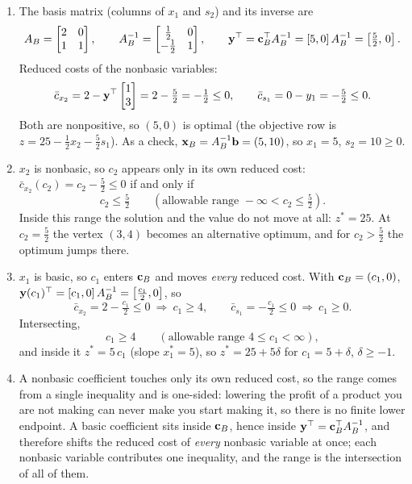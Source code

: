 \begin{enumerate}
\item The basis matrix (columns of $x_1$ and $s_2$) and its inverse are
\[
A_B = \begin{bmatrix} 2 & 0 \\ 1 & 1 \end{bmatrix}, \qquad
A_B^{-1} = \begin{bmatrix} \tfrac12 & 0 \\ -\tfrac12 & 1 \end{bmatrix},
\qquad
\mathbf{y}^\top = \mathbf{c}_B^\top A_B^{-1} = [5, 0]\,A_B^{-1} = \left[\tfrac52,\, 0\right].
\]
Reduced costs of the nonbasic variables:
\[
\bar{c}_{x_2} = 2 - \mathbf{y}^\top \begin{bmatrix} 1 \\ 3 \end{bmatrix} = 2 - \tfrac52 = -\tfrac12 \le 0,
\qquad
\bar{c}_{s_1} = 0 - y_1 = -\tfrac52 \le 0 .
\]
Both are nonpositive, so $(5,0)$ is optimal (the objective row is $z = 25 - \tfrac12 x_2 - \tfrac52 s_1$). As a check, $\mathbf{x}_B = A_B^{-1}\mathbf{b} = (5, 10)$, so $x_1 = 5$, $s_2 = 10 \ge 0$.
\item $x_2$ is nonbasic, so $c_2$ appears only in its own reduced cost: $\bar{c}_{x_2}(c_2) = c_2 - \tfrac52 \le 0$ if and only if
\[
\boxed{c_2 \le \tfrac52} \qquad (\text{allowable range } -\infty < c_2 \le \tfrac52).
\]
Inside this range the solution and the value do not move at all: $z^* = 25$. At $c_2 = \tfrac52$ the vertex $(3,4)$ becomes an alternative optimum, and for $c_2 > \tfrac52$ the optimum jumps there.
\item $x_1$ is basic, so $c_1$ enters $\mathbf{c}_B$ and moves \emph{every} reduced cost. With $\mathbf{c}_B = (c_1, 0)$, $\mathbf{y}(c_1)^\top = [c_1, 0]\,A_B^{-1} = \left[\tfrac{c_1}{2}, 0\right]$, so
\[
\bar{c}_{x_2} = 2 - \tfrac{c_1}{2} \le 0 \ \Rightarrow\ c_1 \ge 4,
\qquad
\bar{c}_{s_1} = -\tfrac{c_1}{2} \le 0 \ \Rightarrow\ c_1 \ge 0 .
\]
Intersecting,
\[
\boxed{c_1 \ge 4} \qquad (\text{allowable range } 4 \le c_1 < \infty),
\]
and inside it $z^* = 5\,c_1$ (slope $x_1^* = 5$), so $z^* = 25 + 5\delta$ for $c_1 = 5 + \delta$, $\delta \ge -1$.
\item A nonbasic coefficient touches only its own reduced cost, so the range comes from a single inequality and is one-sided: lowering the profit of a product you are not making can never make you start making it, so there is no finite lower endpoint. A basic coefficient sits inside $\mathbf{c}_B$, hence inside $\mathbf{y}^\top = \mathbf{c}_B^\top A_B^{-1}$, and therefore shifts the reduced cost of \emph{every} nonbasic variable at once; each nonbasic variable contributes one inequality, and the range is the intersection of all of them.
\end{enumerate}

